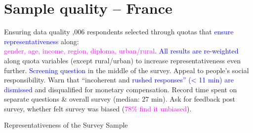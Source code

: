 \section{Sample quality -- France}



\begin{frame}{Ensuring data quality}
\bbs
{},006 respondents selected through quotas that  \textcolor{blue}{ensure representativeness} along: \\ \textcolor{magenta}{gender, age, income, region, diploma, urban/rural}.
\ip \textcolor{blue}{All results are re-weighted} along quota variables (except rural/urban) to increase representativeness even further.
\ip \textcolor{blue}{Screening question} in the middle of the survey. 
\ip Appeal to people's social responsibility. 
\ip Warn that ``incoherent and \textcolor{blue}{rushed responses'' (< 11 min) are dismissed} and disqualified for monetary compensation.
\ip Record time spent on separate questions \& overall survey (median: 27 min).
\ip Ask for feedback post survey, whether felt survey was biased (\textcolor{magenta}{78\% find it unbiased}).
\ee
\end{frame}

\begin{frame}{Representativeness of the Survey Sample}
\begin{table}[h!]
	\begin{center}
		\scalebox{0.55}{}
	\end{center}
\end{table}	
\end{frame}

